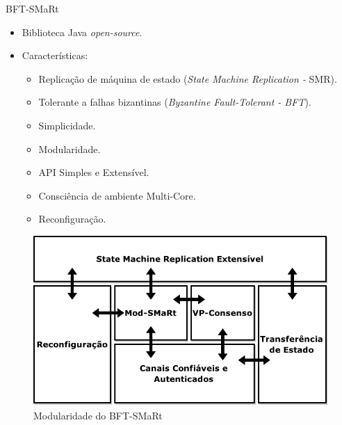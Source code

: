 \begin{frame}{}
\begin{columns}
		
	\end{columns}
\end{frame}

\begin{frame}{BFT-SMaRt}
	\begin{itemize}
		\item Biblioteca Java \textit{open-source}.
		\item Características:
		\begin{itemize}
			\item Replicação de máquina de estado (\textit{State Machine
				Replication - }SMR).
			\item Tolerante a falhas bizantinas (\textit{Byzantine Fault-Tolerant - BFT}).
			\item Simplicidade.
			\item Modularidade.
			\item API Simples e Extensível.
			\item Consciência de ambiente Multi-Core.	
			\item Reconfiguração.
		\end{itemize}
	\end{itemize}
\end{frame}

\begin{frame}{}		
	\begin{figure}
		\includegraphics[width=\textwidth]{imagens/bftsmart1}
		\caption{Modularidade do BFT-SMaRt}
		\label{fig:bftsmart1}
	\end{figure}
\end{frame}

